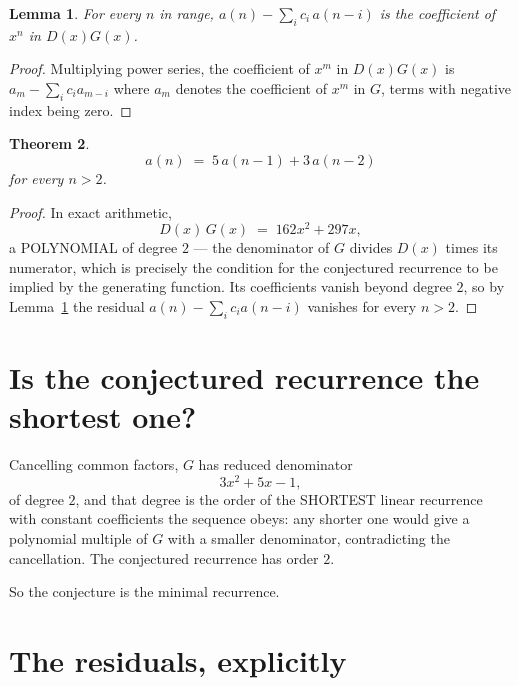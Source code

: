 \documentclass[11pt,a4paper]{article}
\theoremstyle{plain}
\newtheorem{theorem}{Theorem}
\newtheorem{lemma}[theorem]{Lemma}
\theoremstyle{definition}
\begin{document}
\begin{lemma}\label{lem:key}
For every $n$ in range, $a(n)-\sum_i c_i\,a(n-i)$ is the coefficient of $x^{n}$ in
$D(x)G(x)$.
\end{lemma}

\begin{proof}
Multiplying power series, the coefficient of $x^{m}$ in $D(x)G(x)$ is
$a_m-\sum_i c_i a_{m-i}$ where $a_m$ denotes the coefficient of $x^{m}$ in $G$, terms with
negative index being zero.
\end{proof}

\begin{theorem}
\[
a(n)\;=\;5\,a(n-1) + 3\,a(n-2)
\]
for every $n>2$.
\end{theorem}

\begin{proof}
In exact arithmetic,
\[
D(x)\,G(x)\;=\;162 x^{2} + 297 x,
\]
a POLYNOMIAL of degree $2$ --- the denominator of $G$ divides $D(x)$ times its numerator,
which is precisely the condition for the conjectured recurrence to be implied by the
generating function. Its coefficients vanish beyond degree $2$, so by
Lemma~\ref{lem:key} the residual $a(n)-\sum_ic_ia(n-i)$ vanishes for every
$n>2$.
\end{proof}

\section{Is the conjectured recurrence the shortest one?}

Cancelling common factors, $G$ has reduced denominator
\[
3 x^{2} + 5 x - 1,
\]
of degree $2$, and that degree is the order of the SHORTEST linear recurrence with
constant coefficients the sequence obeys: any shorter one would give a polynomial multiple of
$G$ with a smaller denominator, contradicting the cancellation. The conjectured recurrence has
order $2$.

So the conjecture is the minimal recurrence.

\section{The residuals, explicitly}
\end{document}
